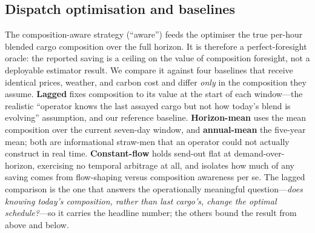 \documentclass[11pt]{article}
\begin{document}
\subsection{Dispatch optimisation and baselines}
%
%

The composition-aware strategy (``aware'') feeds the optimiser the true
per-hour blended cargo composition over the full horizon. It is therefore a
perfect-foresight oracle: the reported saving is a ceiling on the value of
composition foresight, not a deployable estimator result. We compare it against
four baselines that receive identical prices, weather, and carbon cost and differ
\emph{only} in the composition they assume. \textbf{Lagged} fixes composition
to its value at the start of each window---the realistic ``operator knows the
last assayed cargo but not how today's blend is evolving'' assumption, and
our reference baseline. \textbf{Horizon-mean} uses the mean composition over
the current seven-day window, and \textbf{annual-mean} the five-year mean;
both are informational straw-men that an operator could not actually
construct in real time. \textbf{Constant-flow} holds send-out flat at
demand-over-horizon, exercising no temporal arbitrage at all, and isolates
how much of any saving comes from flow-shaping versus composition awareness
per se. The lagged comparison is the one that answers the operationally
meaningful question---\emph{does knowing today's composition, rather than
last cargo's, change the optimal schedule?}---so it carries the headline
number; the others bound the result from above and below.
\end{document}
